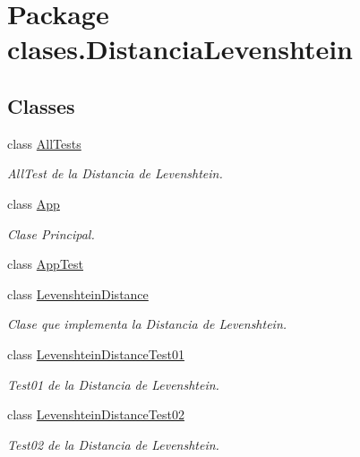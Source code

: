 \hypertarget{namespaceclases_1_1_distancia_levenshtein}{}\section{Package clases.\+Distancia\+Levenshtein}
\label{namespaceclases_1_1_distancia_levenshtein}
\subsection*{Classes}
\begin{DoxyCompactItemize}
\item 
class \hyperlink{classclases_1_1_distancia_levenshtein_1_1_all_tests}{All\+Tests}
\begin{DoxyCompactList}\small\item\em All\+Test de la Distancia de Levenshtein. \end{DoxyCompactList}\item 
class \hyperlink{classclases_1_1_distancia_levenshtein_1_1_app}{App}
\begin{DoxyCompactList}\small\item\em Clase Principal. \end{DoxyCompactList}\item 
class \hyperlink{classclases_1_1_distancia_levenshtein_1_1_app_test}{App\+Test}
\item 
class \hyperlink{classclases_1_1_distancia_levenshtein_1_1_levenshtein_distance}{Levenshtein\+Distance}
\begin{DoxyCompactList}\small\item\em Clase que implementa la Distancia de Levenshtein. \end{DoxyCompactList}\item 
class \hyperlink{classclases_1_1_distancia_levenshtein_1_1_levenshtein_distance_test01}{Levenshtein\+Distance\+Test01}
\begin{DoxyCompactList}\small\item\em Test01 de la Distancia de Levenshtein. \end{DoxyCompactList}\item 
class \hyperlink{classclases_1_1_distancia_levenshtein_1_1_levenshtein_distance_test02}{Levenshtein\+Distance\+Test02}
\begin{DoxyCompactList}\small\item\em Test02 de la Distancia de Levenshtein. \end{DoxyCompactList}\item 

\end{DoxyCompactItemize}
